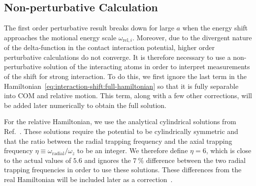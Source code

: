 \subsection{Non-perturbative Calculation}
\label{ch:interaction-shift:theory:non-perturb}

The first order perturbative result breaks down for large $a$ when the energy shift
approaches the motional energy scale $\omega_{\mathrm{rel},i}$.
Moreover, due to the divergent nature of the delta-function in the contact interaction potential,
higher order perturbative calculations do not converge.
It is therefore necessary to use a non-perturbative solution of the interacting atoms
in order to interpret measurements of the shift for strong interaction.
To do this, we first ignore the last term in
the Hamiltonian~\ref{eq:interaction-shift:full-hamiltonian} so that it is fully separable
into COM and relative motion.
This term, along with a few other corrections,
will be added later numerically to obtain the full solution.

For the relative Hamiltonian, we use the analytical cylindrical solutions
from Ref.~\cite{idziaszek_analytical_2006}.
These solutions require the potential to be cylindrically symmetric and
that the ratio between the radial trapping frequency
and the axial trapping frequency $\eta\equiv\omega_{\mathrm{radial}}/\omega_z$
to be an integer.
We therefore define $\eta = 6$, which is close to the actual values of $5.6$
and ignores the $7~\mathrm{\%}$ difference between the two radial trapping frequencies
in order to use these solutions.
These differences from the real Hamiltonian will be included later as a correction~\cite{
  bertelsen_association_2007,deuretzbacher_heteronuclear_2008}.


